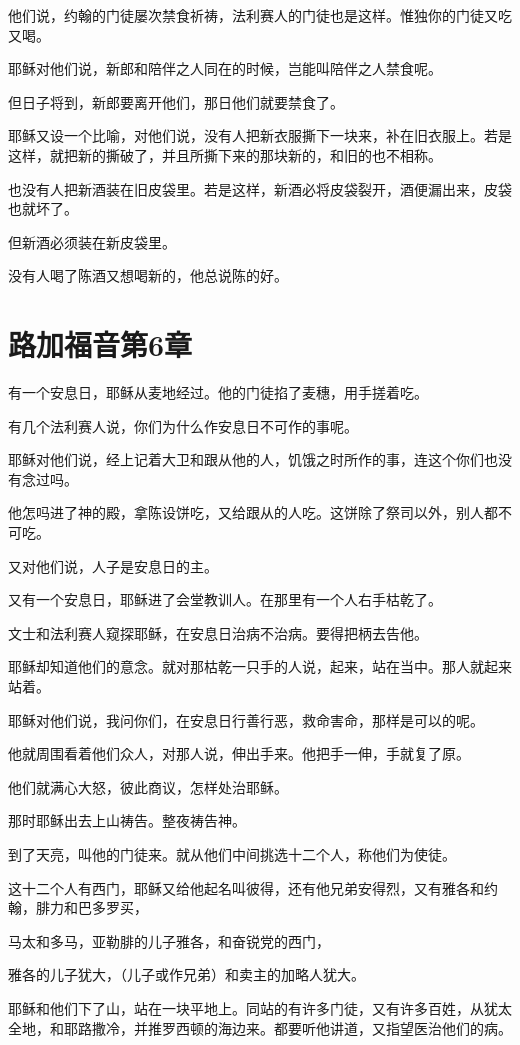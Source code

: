 \documentclass[12pt,oneside]{book}
\begin{document}
他们说，约翰的门徒屡次禁食祈祷，法利赛人的门徒也是这样。惟独你的门徒又吃又喝。

耶稣对他们说，新郎和陪伴之人同在的时候，岂能叫陪伴之人禁食呢。

但日子将到，新郎要离开他们，那日他们就要禁食了。

耶稣又设一个比喻，对他们说，没有人把新衣服撕下一块来，补在旧衣服上。若是这样，就把新的撕破了，并且所撕下来的那块新的，和旧的也不相称。

也没有人把新酒装在旧皮袋里。若是这样，新酒必将皮袋裂开，酒便漏出来，皮袋也就坏了。

但新酒必须装在新皮袋里。

没有人喝了陈酒又想喝新的，他总说陈的好。

\chapter{路加福音第6章}
有一个安息日，耶稣从麦地经过。他的门徒掐了麦穗，用手搓着吃。

有几个法利赛人说，你们为什么作安息日不可作的事呢。

耶稣对他们说，经上记着大卫和跟从他的人，饥饿之时所作的事，连这个你们也没有念过吗。

他怎吗进了神的殿，拿陈设饼吃，又给跟从的人吃。这饼除了祭司以外，别人都不可吃。

又对他们说，人子是安息日的主。

又有一个安息日，耶稣进了会堂教训人。在那里有一个人右手枯乾了。

文士和法利赛人窥探耶稣，在安息日治病不治病。要得把柄去告他。

耶稣却知道他们的意念。就对那枯乾一只手的人说，起来，站在当中。那人就起来站着。

耶稣对他们说，我问你们，在安息日行善行恶，救命害命，那样是可以的呢。

他就周围看着他们众人，对那人说，伸出手来。他把手一伸，手就复了原。

他们就满心大怒，彼此商议，怎样处治耶稣。

那时耶稣出去上山祷告。整夜祷告神。

到了天亮，叫他的门徒来。就从他们中间挑选十二个人，称他们为使徒。

这十二个人有西门，耶稣又给他起名叫彼得，还有他兄弟安得烈，又有雅各和约翰，腓力和巴多罗买，

马太和多马，亚勒腓的儿子雅各，和奋锐党的西门，

雅各的儿子犹大，（儿子或作兄弟）和卖主的加略人犹大。

耶稣和他们下了山，站在一块平地上。同站的有许多门徒，又有许多百姓，从犹太全地，和耶路撒冷，并推罗西顿的海边来。都要听他讲道，又指望医治他们的病。
\end{document}
